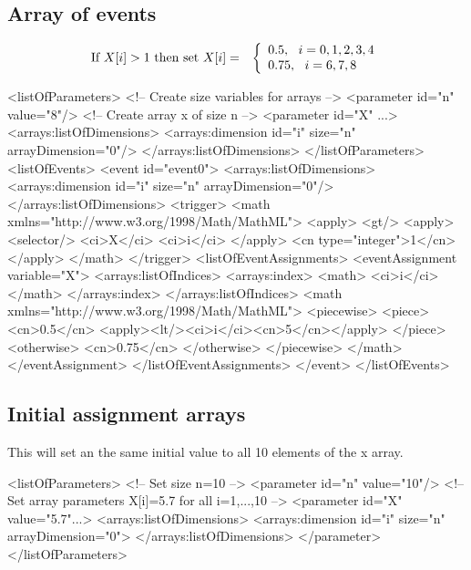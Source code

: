 \subsection{Array of events}

\begin{eqnarray*}
\textup{If }X[i] > 1\textup{ then set }X[i] & = & \left\{ \begin{array}{l}
0.5,~~i = 0, 1, 2, 3, 4 \\
0.75,~~i = 6, 7, 8
\end{array}
\right.
\end{eqnarray*}

\begin{example}
<listOfParameters>
 <!-- Create size variables for arrays -->
 <parameter id="n" value="8"/>
 <!-- Create array x of size n -->
 <parameter id="X" ...> 
  <arrays:listOfDimensions>
   <arrays:dimension id="i" size="n" arrayDimension="0"/>
  </arrays:listOfDimensions>
</listOfParameters>
<listOfEvents>
 <event id="event0">
  <arrays:listOfDimensions>
   <arrays:dimension id="i" size="n" arrayDimension="0"/>
  </arrays:listOfDimensions>
  <trigger>
   <math xmlns="http://www.w3.org/1998/Math/MathML">
     <apply>
       <gt/>
         <apply>
           <selector/>
           <ci>X</ci>
           <ci>i</ci>
         </apply>
       <cn type="integer">1</cn>
     </apply>
   </math>
  </trigger>
  <listOfEventAssignments>
   <eventAssignment variable="X">
    <arrays:listOfIndices>
     <arrays:index>
      <math>
       <ci>i</ci>
      </math>
     </arrays:index>
    </arrays:listOfIndices>
    <math xmlns="http://www.w3.org/1998/Math/MathML">
      <piecewise>
        <piece>
          <cn>0.5</cn>
          <apply><lt/><ci>i</ci><cn>5</cn></apply>
        </piece>
        <otherwise>
          <cn>0.75</cn>
        </otherwise>
      </piecewise>
    </math>
   </eventAssignment>
  </listOfEventAssignments>
 </event>
</listOfEvents>
\end{example}

\subsection{Initial assignment arrays}

This will set an the same initial value to all 10 elements of the x array.

\begin{example}
<listOfParameters>
 <!-- Set size n=10 -->
 <parameter id="n" value="10"/>
 <!-- Set array parameters X[i]=5.7 for all i=1,...,10 -->
 <parameter id="X" value="5.7"...>
  <arrays:listOfDimensions>
   <arrays:dimension id="i" size="n" arrayDimension="0">
  </arrays:listOfDimensions> 
 </parameter>
</listOfParameters>
\end{example}

